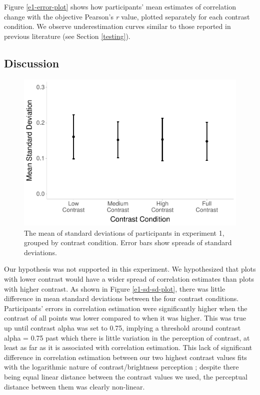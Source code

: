 \documentclass[preprint, 3p,
authoryear]{elsarticle} %
\begin{document}
Figure \ref{e1-error-plot} shows how participants' mean estimates of
correlation change with the objective Pearson's \emph{r} value, plotted
separately for each contrast condition. We observe underestimation
curves similar to those reported in previous literature (see Section
\ref{testing}).

\hypertarget{discussion}{%
\subsection{Discussion}\label{discussion}}

\begin{figure}

\includegraphics[width=0.5\linewidth]{contrast_and_scatterplots_files/figure-latex/e1-sd-sd-plot-1} \hfill{}

\caption{\label{e1-sd-sd-plot}The mean of standard deviations of participants in experiment 1, grouped by contrast condition. Error bars show spreads of standard deviations.}\label{fig:e1-sd-sd-plot}
\end{figure}

Our hypothesis was not supported in this experiment. We hypothesized
that plots with lower contrast would have a wider spread of correlation
estimates than plots with higher contrast. As shown in Figure
\ref{e1-sd-sd-plot}, there was little difference in mean standard
deviations between the four contrast conditions. Participants' errors in
correlation estimation were significantly higher when the contrast of
all points was lower compared to when it was higher. This was true up
until contrast alpha was set to 0.75, implying a threshold around
contrast alpha = 0.75 past which there is little variation in the
perception of contrast, at least as far as it is associated with
correlation estimation. This lack of significant difference in
correlation estimation between our two highest contrast values fits with
the logarithmic nature of contrast/brightness perception
\citep{varshney_2013, fechner_1948}; despite there being equal linear
distance between the contrast values we used, the perceptual distance
between them was clearly non-linear.
\end{document}
